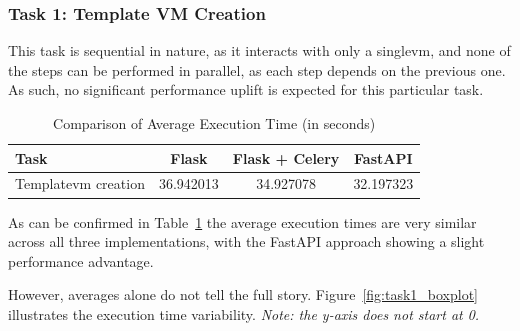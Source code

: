         \subsubsection{Task 1: Template VM Creation}

            This task is sequential in nature, as it interacts with only a single\ac{vm}, and none of the steps can be performed in 
            parallel, as each step depends on the previous one. As such, no significant performance uplift is expected for this particular 
            task.

            \begin{table}[ht]
                \centering
                \caption{Comparison of Average Execution Time (in seconds)}
                \begin{tabular}{|l|c|c|c|}
                    \hline
                    \textbf{Task} & \textbf{Flask} & \textbf{Flask + Celery} & \textbf{FastAPI} \\
                    \hline
                    Template\ac{vm} creation & 36.942013 & 34.927078 & 32.197323 \\
                    \hline
                \end{tabular}
                \label{tab:task1_plot}
            \end{table}

            As can be confirmed in Table~\ref{tab:task1_plot} the average execution times are very similar across all three implementations, 
            with the FastAPI approach showing a slight performance advantage.

            However, averages alone do not tell the full story. Figure~\ref{fig:task1_boxplot} illustrates the execution time variability. 
            \textit{Note: the y-axis does not start at 0.}


